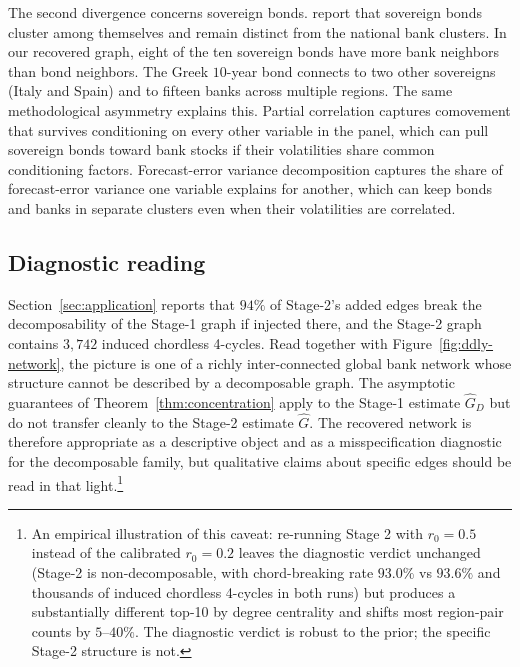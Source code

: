 The second divergence concerns sovereign bonds. \textcite{demirer2018estimating} report that sovereign bonds cluster among themselves and remain distinct from the national bank clusters. In our recovered graph, eight of the ten sovereign bonds have more bank neighbors than bond neighbors. The Greek $10$-year bond connects to two other sovereigns (Italy and Spain) and to fifteen banks across multiple regions. The same methodological asymmetry explains this. Partial correlation captures comovement that survives conditioning on every other variable in the panel, which can pull sovereign bonds toward bank stocks if their volatilities share common conditioning factors. Forecast-error variance decomposition captures the share of forecast-error variance one variable explains for another, which can keep bonds and banks in separate clusters even when their volatilities are correlated.

\subsection{Diagnostic reading}

Section~\ref{sec:application} reports that $94\%$ of Stage-2's added edges break the decomposability of the Stage-1 graph if injected there, and the Stage-2 graph contains $3{,}742$ induced chordless 4-cycles. Read together with Figure~\ref{fig:ddly-network}, the picture is one of a richly inter-connected global bank network whose structure cannot be described by a decomposable graph. The asymptotic guarantees of Theorem~\ref{thm:concentration} apply to the Stage-1 estimate $\hat G_D$ but do not transfer cleanly to the Stage-2 estimate $\hat G$. The recovered network is therefore appropriate as a descriptive object and as a misspecification diagnostic for the decomposable family, but qualitative claims about specific edges should be read in that light.\footnote{An empirical illustration of this caveat: re-running Stage 2 with $r_0 = 0.5$ instead of the calibrated $r_0 = 0.2$ leaves the diagnostic verdict unchanged (Stage-2 is non-decomposable, with chord-breaking rate $93.0\%$ vs $93.6\%$ and thousands of induced chordless 4-cycles in both runs) but produces a substantially different top-10 by degree centrality and shifts most region-pair counts by $5$--$40\%$. The diagnostic verdict is robust to the prior; the specific Stage-2 structure is not.}

